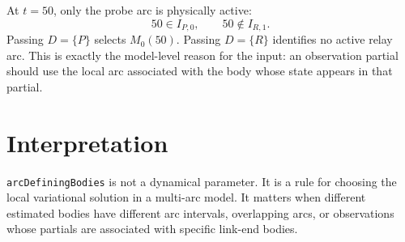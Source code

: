 \documentclass[11pt,a4paper]{article}
\begin{document}
At \(t=50\), only the probe arc is physically active:
\[
    50 \in I_{P,0},
    \qquad
    50 \notin I_{R,1}.
\]
Passing \(D=\{P\}\) selects \(M_0(50)\). Passing \(D=\{R\}\) identifies no active
relay arc. This is exactly the model-level reason for the input: an observation
partial should use the local arc associated with the body whose state appears in
that partial.

\section*{Interpretation}

\texttt{arcDefiningBodies} is not a dynamical parameter. It is a rule for
choosing the local variational solution in a multi-arc model. It matters when
different estimated bodies have different arc intervals, overlapping arcs, or
observations whose partials are associated with specific link-end bodies.
\end{document}
